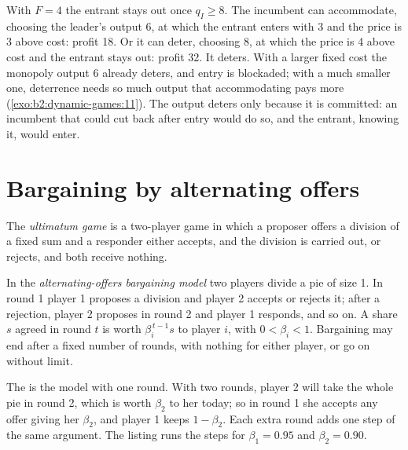 With $F = 4$ the entrant stays out once $q_I \ge 8$. The incumbent can accommodate, choosing the leader's output 6, at
which the entrant enters with 3 and the price is 3 above cost: profit 18. Or it can deter, choosing 8, at which the
price is 4 above cost and the entrant stays out: profit 32. It deters. With a larger fixed cost the monopoly
output 6 already deters, and entry is blockaded; with a much smaller one, deterrence needs so much output that
accommodating pays more (\cref{exo:b2:dynamic-games:11}). The output deters only because it is committed: an
incumbent that could cut back after entry would do so, and the entrant, knowing it, would enter.

\section{Bargaining by alternating offers}\label{sec:b2:dynamic-games:bargaining}

\begin{definition}\label{def:b2:dynamic-games:ultimatum}
The \emph{ultimatum game} is a two-player game in which a proposer offers a division
of a fixed sum and a responder either accepts, and the division is carried out, or rejects, and both
receive nothing.
\end{definition}

\begin{definition}\label{def:b2:dynamic-games:alternating-offers}
In the \emph{alternating-offers bargaining model} two players
divide a pie of size 1. In round 1 player 1 proposes a division and player 2 accepts or rejects it; after a
rejection, player 2 proposes in round 2 and player 1 responds, and so on. A share $s$ agreed in round $t$ is
worth $\beta_i^{\,t-1} s$ to player $i$, with $0 < \beta_i < 1$. Bargaining may end after a fixed number of rounds, with
nothing for either player, or go on without limit.
\end{definition}

The  is the model with one round. With two rounds, player 2 will take the whole pie in round 2,
which is worth $\beta_2$ to her today; so in round 1 she accepts any offer giving her $\beta_2$, and player 1 keeps $1 -
\beta_2$. Each extra round adds one step of the same argument. The listing runs the steps for 
$\beta_1 = 0.95$ and $\beta_2 = 0.90$.

